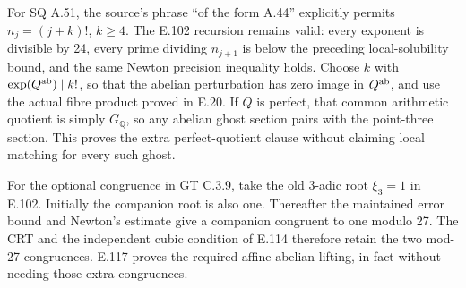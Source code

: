 For SQ A.51, the source's phrase ``of the form A.44'' explicitly permits
\(n_j=(j+k)!\), \(k\ge4\). The E.102 recursion remains valid: every
exponent is divisible by 24, every prime dividing \(n_{j+1}\) is below
the preceding local-solubility bound, and the same Newton precision
inequality holds. Choose \(k\) with \(\exp(Q^{\rm ab})\mid k!\),
so that the abelian perturbation has zero image in \(Q^{\rm ab}\),
and use the actual fibre product proved in E.20. If \(Q\) is perfect,
that common arithmetic quotient is simply \(G_{\mathbb Q}\), so any
abelian ghost section pairs with the point-three section. This proves
the extra perfect-quotient clause without claiming local matching for
every such ghost.

For the optional congruence in GT C.3.9, take the old 3-adic root
\(\xi_3=1\) in E.102. Initially the companion root is also one.
Thereafter the maintained error bound and Newton's estimate give a
companion congruent to one modulo 27. The CRT and the independent
cubic condition of E.114 therefore retain the two mod-27 congruences.
E.117 proves the required affine abelian lifting, in fact without
needing those extra congruences.
